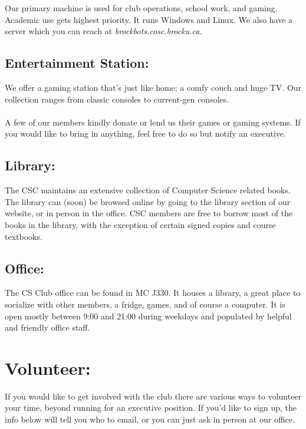 \documentclass[10pt,letterpaper]{article}
\begin{document}
\begin{multicols}{3}
Our primary machine is used for club operations, school work, and gaming.
Academic use gets highest priority. It runs Windows and Linux.
We also have a server which you can reach at \emph{brockbots.cosc.brocku.ca}.

\subsection*{Entertainment Station:}

We offer a gaming station that's just like home; a comfy couch and huge TV.
Our collection ranges from classic consoles to current-gen consoles.\\
\\
A few of our members kindly donate or lend us their games or gaming systems. If you would
like to bring in anything, feel free to do so but notify an executive.

\subsection*{Library:}

The CSC maintains an extensive collection of Computer Science related 
books. The library can (soon) be browsed online by going to the library section of our
website, or in person in the office. CSC members are free to borrow most of 
the books in the library, with the exception of certain signed copies and
course textbooks.

\subsection*{Office:}

The CS Club office can be found in MC J330. It houses a library, a great
place to socialize with other members, a fridge, games, and of
course a computer. It is open mostly between 9:00 and 21:00 during weekdays
and populated by helpful and friendly office staff.


\section*{Volunteer:}

If you would like to get involved with the club there are various ways to
volunteer your time, beyond running for an executive position. If you'd like
to sign up, the info below will tell you who to email, or you can just ask
in person at our office.


\end{multicols}
\end{document}
